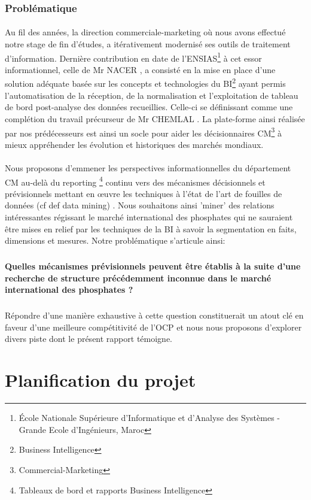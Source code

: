 	\subsubsection{Problématique}
	
	\paragraph{}
Au fil des années, la direction commerciale-marketing où nous avons effectué notre stage de fin d'études, a itérativement modernisé ses outils de traitement d'information. Dernière contribution en date de l'ENSIAS\footnote{École Nationale Supérieure d'Informatique et d'Analyse des Systèmes - Grande Ecole d'Ingénieurs, Maroc} à cet essor informationnel, celle de Mr NACER \cite{NACER}, a consisté en la mise en place d'une solution adéquate basée sur les concepts et technologies du BI\footnote{Business Intelligence} ayant permis l'automatisation de la réception, de la normalisation et l'exploitation de tableau de bord post-analyse des données recueillies. Celle-ci se définissant comme une complétion du travail précurseur de Mr CHEMLAL \cite{CHEMLAL}.  La plate-forme ainsi réalisée par nos prédécesseurs est ainsi un socle pour aider les décisionnaires CM\footnote{Commercial-Marketing} à mieux appréhender les évolution et historiques des marchés mondiaux.
\paragraph{}Nous proposons d'emmener les perspectives informationnelles du département CM au-delà du reporting \footnote{Tableaux de bord et rapports Business Intelligence} continu vers des mécanismes décisionnels et prévisionnels mettant en œuvre les techniques à l'état de l'art de fouilles de données (cf def data mining) . Nous souhaitons ainsi 'miner' des relations intéressantes régissant le marché international des phosphates qui ne sauraient être mises en relief par les techniques de la BI à savoir la segmentation en faits, dimensions et mesures. Notre problématique s'articule ainsi:\subparagraph*{}\textbf{Quelles mécanismes prévisionnels peuvent être établis à la suite d'une recherche de structure précédemment inconnue dans le marché international des phosphates ?}\subparagraph*{}Répondre d'une manière exhaustive à cette question constituerait un atout clé en faveur d'une meilleure compétitivité de l'OCP et nous nous proposons d'explorer divers piste dont le présent rapport témoigne. 
\section{Planification du projet}
